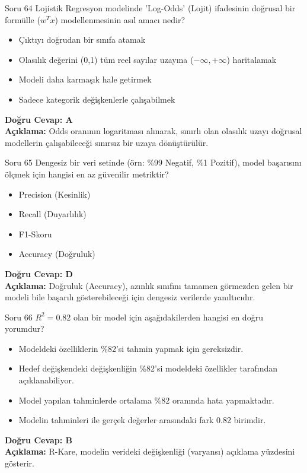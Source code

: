 \documentclass[12pt,a4paper]{article}
\begin{document}
\begin{testcard}{Soru 64}
    Lojistik Regresyon modelinde 'Log-Odds' (Lojit) ifadesinin doğrusal bir formülle ($w^T x$) modellenmesinin asıl amacı nedir?
    \begin{itemize}
        \item[A)] Çıktıyı doğrudan bir sınıfa atamak
        \item[B)] Olasılık değerini (0,1) tüm reel sayılar uzayına ($-\infty, +\infty$) haritalamak
        \item[C)] Modeli daha karmaşık hale getirmek
        \item[D)] Sadece kategorik değişkenlerle çalışabilmek
    \end{itemize}
    \tcblower
    \textbf{Doğru Cevap: A} \\
    \textbf{Açıklama:} Odds oranının logaritması alınarak, sınırlı olan olasılık uzayı doğrusal modellerin çalışabileceği sınırsız bir uzaya dönüştürülür.
\end{testcard}

\begin{testcard}{Soru 65}
    Dengesiz bir veri setinde (örn: \%99 Negatif, \%1 Pozitif), model başarısını ölçmek için hangisi en az güvenilir metriktir?
    \begin{itemize}
        \item[A)] Precision (Kesinlik)
        \item[B)] Recall (Duyarlılık)
        \item[C)] F1-Skoru
        \item[D)] Accuracy (Doğruluk)
    \end{itemize}
    \tcblower
    \textbf{Doğru Cevap: D} \\
    \textbf{Açıklama:} Doğruluk (Accuracy), azınlık sınıfını tamamen görmezden gelen bir modeli bile başarılı gösterebileceği için dengesiz verilerde yanıltıcıdır.
\end{testcard}

\begin{testcard}{Soru 66}
    $R^2 = 0.82$ olan bir model için aşağıdakilerden hangisi en doğru yorumdur?
    \begin{itemize}
        \item[A)] Modeldeki özelliklerin \%82'si tahmin yapmak için gereksizdir.
        \item[B)] Hedef değişkendeki değişkenliğin \%82'si modeldeki özellikler tarafından açıklanabiliyor.
        \item[C)] Model yapılan tahminlerde ortalama \%82 oranında hata yapmaktadır.
        \item[D)] Modelin tahminleri ile gerçek değerler arasındaki fark 0.82 birimdir.
    \end{itemize}
    \tcblower
    \textbf{Doğru Cevap: B} \\
    \textbf{Açıklama:} R-Kare, modelin verideki değişkenliği (varyansı) açıklama yüzdesini gösterir.
\end{testcard}
\end{document}
